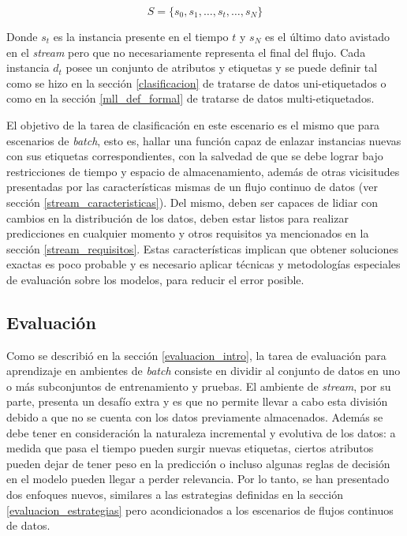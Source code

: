 \begin{equation}
	S = \{s_{0}, s_{1}, \dots, s_{t}, \dots, s_{N}\}
\end{equation}

Donde $s_{t}$ es la instancia presente en el tiempo $t$ y $s_{N}$ es el último
dato avistado en el \textit{stream} pero que no necesariamente representa el
final del flujo. Cada instancia $d_{t}$ posee un conjunto de atributos y
etiquetas y se puede definir tal como se hizo en la sección \ref{clasificacion}
de tratarse de datos uni-etiquetados o como en la sección \ref{mll_def_formal}
de tratarse de datos multi-etiquetados.

El objetivo de la tarea de clasificación en este escenario es el mismo que para
escenarios de \textit{batch}, esto es, hallar una función capaz de enlazar
instancias nuevas con sus etiquetas correspondientes, con la salvedad de que se
debe lograr bajo restricciones de tiempo y espacio de almacenamiento, además de
otras vicisitudes presentadas por las características mismas de un flujo
continuo de datos (ver sección \ref{stream_caracteristicas}). Del mismo, deben
ser capaces de lidiar con cambios en la distribución de los datos, deben estar
listos para realizar predicciones en cualquier momento y otros requisitos ya
mencionados en la sección \ref{stream_requisitos}. Estas características
implican que obtener soluciones exactas es poco probable y es necesario aplicar
técnicas y metodologías especiales de evaluación sobre los modelos, para reducir
el error posible.


\subsection{Evaluación}
\label{stream_evaluacion}

Como se describió en la sección \ref{evaluacion_intro}, la tarea de evaluación
para aprendizaje en ambientes de \textit{batch} consiste en dividir al conjunto
de datos en uno o más subconjuntos de entrenamiento y pruebas.  El ambiente de
\textit{stream}, por su parte, presenta un desafío extra y es que no permite
llevar a cabo esta división debido a que no se cuenta con los datos previamente
almacenados. Además se debe tener en consideración la naturaleza incremental y
evolutiva de los datos: a medida que pasa el tiempo pueden surgir nuevas
etiquetas, ciertos atributos pueden dejar de tener peso en la predicción o
incluso algunas reglas de decisión en el modelo pueden llegar a perder
relevancia. Por lo tanto, se han presentado dos enfoques nuevos, similares a las
estrategias definidas en la sección \ref{evaluacion_estrategias} pero
acondicionados a los escenarios de flujos continuos de datos.

